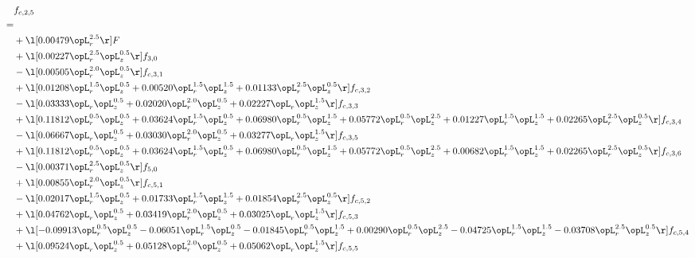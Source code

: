\begin{alignat}{2} 
\label{eq:f_25_2} 
& f_{c,2,5} \nonumber \\ 
 = \\ 
& + \l[  0.00479 \opL_r^{2.5}  \r] F \nonumber \\ 
& + \l[  0.00227 \opL_r^{2.5} \opL_z^{0.5}  \r] f_{3,0} \nonumber \\ 
& - \l[  0.00505 \opL_r^{2.0} \opL_z^{0.5}  \r] f_{c,3,1} \nonumber \\ 
& + \l[  0.01208 \opL_r^{1.5} \opL_z^{0.5} +  0.00520 \opL_r^{1.5} \opL_z^{1.5} +  0.01133 \opL_r^{2.5} \opL_z^{0.5}  \r] f_{c,3,2} \nonumber \\ 
& - \l[  0.03333 \opL_r \opL_z^{0.5} +  0.02020 \opL_r^{2.0} \opL_z^{0.5} +  0.02227 \opL_r \opL_z^{1.5}  \r] f_{c,3,3} \nonumber \\ 
& + \l[  0.11812 \opL_r^{0.5} \opL_z^{0.5} +  0.03624 \opL_r^{1.5} \opL_z^{0.5} +  0.06980 \opL_r^{0.5} \opL_z^{1.5} +  0.05772 \opL_r^{0.5} \opL_z^{2.5} +  0.01227 \opL_r^{1.5} \opL_z^{1.5} +  0.02265 \opL_r^{2.5} \opL_z^{0.5}  \r] f_{c,3,4} \nonumber \\ 
& - \l[  0.06667 \opL_r \opL_z^{0.5} +  0.03030 \opL_r^{2.0} \opL_z^{0.5} +  0.03277 \opL_r \opL_z^{1.5}  \r] f_{c,3,5} \nonumber \\ 
& + \l[  0.11812 \opL_r^{0.5} \opL_z^{0.5} +  0.03624 \opL_r^{1.5} \opL_z^{0.5} +  0.06980 \opL_r^{0.5} \opL_z^{1.5} +  0.05772 \opL_r^{0.5} \opL_z^{2.5} +  0.00682 \opL_r^{1.5} \opL_z^{1.5} +  0.02265 \opL_r^{2.5} \opL_z^{0.5}  \r] f_{c,3,6} \nonumber \\ 
& - \l[  0.00371 \opL_r^{2.5} \opL_z^{0.5}  \r] f_{5,0} \nonumber \\ 
& + \l[  0.00855 \opL_r^{2.0} \opL_z^{0.5}  \r] f_{c,5,1} \nonumber \\ 
& - \l[  0.02017 \opL_r^{1.5} \opL_z^{0.5} +  0.01733 \opL_r^{1.5} \opL_z^{1.5} +  0.01854 \opL_r^{2.5} \opL_z^{0.5}  \r] f_{c,5,2} \nonumber \\ 
& + \l[  0.04762 \opL_r \opL_z^{0.5} +  0.03419 \opL_r^{2.0} \opL_z^{0.5} +  0.03025 \opL_r \opL_z^{1.5}  \r] f_{c,5,3} \nonumber \\ 
& + \l[  -0.09913 \opL_r^{0.5} \opL_z^{0.5}   -0.06051 \opL_r^{1.5} \opL_z^{0.5}   -0.01845 \opL_r^{0.5} \opL_z^{1.5} +  0.00290 \opL_r^{0.5} \opL_z^{2.5}   -0.04725 \opL_r^{1.5} \opL_z^{1.5}   -0.03708 \opL_r^{2.5} \opL_z^{0.5}  \r] f_{c,5,4} \nonumber \\ 
& + \l[  0.09524 \opL_r \opL_z^{0.5} +  0.05128 \opL_r^{2.0} \opL_z^{0.5} +  0.05062 \opL_r \opL_z^{1.5}  \r] f_{c,5,5} \nonumber \\ 

\end{alignat}
